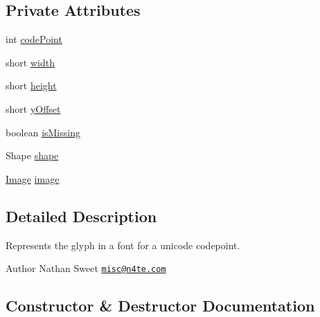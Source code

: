 \subsection*{Private Attributes}
\begin{DoxyCompactItemize}
\item 
int \mbox{\hyperlink{classorg_1_1newdawn_1_1slick_1_1font_1_1_glyph_a7aea2e2bd765045b2457d58e14052e37}{code\+Point}}
\item 
short \mbox{\hyperlink{classorg_1_1newdawn_1_1slick_1_1font_1_1_glyph_a3607f8f4c231c2f6cb6d212019d050f6}{width}}
\item 
short \mbox{\hyperlink{classorg_1_1newdawn_1_1slick_1_1font_1_1_glyph_a43d234609f29c664ecbc31f452ba3367}{height}}
\item 
short \mbox{\hyperlink{classorg_1_1newdawn_1_1slick_1_1font_1_1_glyph_ae04dea0b41cbbcd6b10c7f70a8c704f8}{y\+Offset}}
\item 
boolean \mbox{\hyperlink{classorg_1_1newdawn_1_1slick_1_1font_1_1_glyph_a2c3531619f39b75c4397936c6916e630}{is\+Missing}}
\item 
Shape \mbox{\hyperlink{classorg_1_1newdawn_1_1slick_1_1font_1_1_glyph_a128faa13d2bf71ee4ce3cd3a77e7682f}{shape}}
\item 
\mbox{\hyperlink{classorg_1_1newdawn_1_1slick_1_1_image}{Image}} \mbox{\hyperlink{classorg_1_1newdawn_1_1slick_1_1font_1_1_glyph_af4fe8b4f2cdf72e687e7582fd5e210db}{image}}
\end{DoxyCompactItemize}


\subsection{Detailed Description}
Represents the glyph in a font for a unicode codepoint.

\begin{DoxyAuthor}{Author}
Nathan Sweet \href{mailto:misc@n4te.com}{\tt misc@n4te.\+com} 
\end{DoxyAuthor}


\subsection{Constructor \& Destructor Documentation}
\mbox{\label{classorg_1_1newdawn_1_1slick_1_1font_1_1_glyph_a0bfc907228474ef5723f23da1fa10fc1}} 
